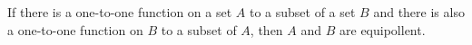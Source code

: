 
\begin{theorem}
    \label{thrm:class1:bernstein}
    If there is a one-to-one function on a set $A$ to a subset of a set $B$ and
    there is also a one-to-one function on $B$ to a subset of $A$, then $A$ and
    $B$ are equipollent.
\end{theorem}

